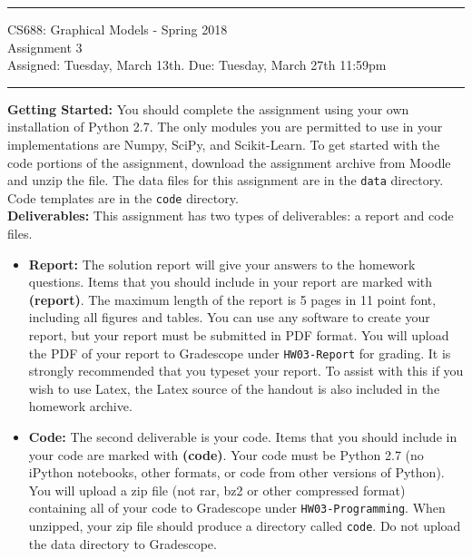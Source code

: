 \documentclass[11pt]{article}
\begin{document}
{\centering
  \rule{6.3in}{2pt}
  \vspace{1em}
  {\Large
    CS688: Graphical Models - Spring 2018\\
    Assignment 3\\
  }
  \vspace{1em}
  Assigned: Tuesday, March 13th. Due: Tuesday, March 27th 11:59pm\\
  \vspace{0.1em}
  \rule{6.3in}{1.5pt}
}\vspace{1em}

\textbf{Getting Started:} You should complete the assignment using your own installation of Python 2.7. The only modules you are permitted to use in your implementations are Numpy, SciPy, and Scikit-Learn. To get started with the code portions of the assignment, download the assignment archive from Moodle and unzip the file. The data files for this assignment are in the \texttt{data} directory. Code templates are in the \texttt{code} directory.\\

\textbf{Deliverables:} This assignment has two types of deliverables: a report and code files.

\begin{itemize}
\item \textbf{Report: } The solution report will give your answers to the homework questions. Items that you should include in your report are marked with \textbf{(report)}. The maximum length of the report is 5 pages in 11 point font, including all figures and tables. You can use any software to create your report, but your report must be submitted in PDF format. You will upload the PDF of your report to Gradescope under \verb|HW03-Report| for grading. It is strongly recommended that you typeset your report. To assist with this if you wish to use Latex, the Latex source of the handout is also included in the homework archive.

\item \textbf{Code: } The second deliverable is your code. Items that you should include in your code are marked with \textbf{(code)}.  Your code must be Python 2.7 (no iPython notebooks, other formats, or code from other versions of Python). You will upload a zip file (not rar, bz2 or other compressed format) containing all of your code to Gradescope under \verb|HW03-Programming|.  When unzipped, your zip file should produce a directory called \verb|code|. Do not 
upload the data directory to Gradescope.

\end{itemize}
\vspace{0.5em}
\end{document}
